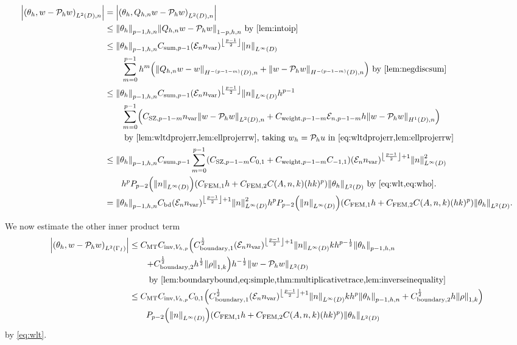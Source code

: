 \begin{align}
\abs{\IPLtDn{\thetah}{w- \Ph w}} &= \abs{\IPLtDn{\thetah}{\Qhn w - \Ph w}}\nonumber\\
&\leq \Nfn{p-1,h,n}{\thetah}\Nfn{1-p,h,n}{\Qhn w - \Ph w}\text{ by \cref{lem:intoip}}\nonumber\\
&\leq \Nfn{p-1,h,n}{\thetah} \Csumfn{p-1} \mleft(\En \nvar\mright)^{\floor{\frac{p-1}2}}\NLiD{n}\nonumber\\
&\quad\quad\sum_{m=0}^{p-1} h^{m}\mleft(\NHnfn{-(p-1-m)}{D}{\Qhn w - w}+ \NHnfn{-(p-1-m)}{D}{w - \Ph w}\mright) \text{ by \cref{lem:negdiscsum}}\nonumber\\
&\leq \Nfn{p-1,h,n}{\thetah} \Csumfn{p-1}\mleft(\En \nvar\mright)^{\floor{\frac{p-1}2}}\NLiD{n} h^{p-1}\nonumber\\
&\quad\quad\sum_{m=0}^{p-1} \mleft(\CSZfn{p-1-m}\nvar \NLtDn{w - \Ph w} + \Cwfn{p-1-m} \errn{p-1-m} h \NHoDn{w - \Ph w}\mright)\nonumber\\
&\quad\quad\text{ by \cref{lem:wltdprojerr,lem:ellprojerrw}, taking $\wh = \Ph u$ in \cref{eq:wltdprojerr,lem:ellprojerrw}}\nonumber\\
&\leq \Nfn{p-1,h,n}{\thetah} \Csumfn{p-1}\sum_{m=0}^{p-1} \mleft(\CSZfn{p-1-m}\Cfn{0,1} + \Cwfn{p-1-m} \Cfn{-1,1}\mright)                         \mleft(\En \nvar\mright)^{\floor{\frac{p-1}2}+1}\NLiD{n}^2 \nonumber\\
&\quad\quad h^p \Pfn{p-2}\mleft(\NLiD{n}\mright)\mleft(\CFEMotilde h + \CFEMttilde \CAnk (hk)^p\mright) \NLtD{\thetah} \text{ by \cref{eq:wlt,eq:who}}.\nonumber\\
&=\Nfn{p-1,h,n}{\thetah}  \Cfourteen \mleft(\En \nvar\mright)^{\floor{\frac{p-1}2}+1}\NLiD{n}^2 h^p \Pfn{p-2}\mleft(\NLiD{n}\mright)\mleft(\CFEMotilde h + \CFEMttilde \CAnk (hk)^p\mright) \NLtD{\thetah} \label{eq:innerprod1}.
\end{align}

We now estimate the other inner product term
\begin{align}
\abs{\IPLtGI{\thetah}{w - \Ph w}} &\leq \CMT\CinvVhp\mleft(\Cboundaryo^{\half} \mleft(\En\nvar\mright)^{\floor{\frac{p-1}2}+1}\NLiD{n} k h^{p-\half} \Nfn{p-1,h,n}{\thetah}\mright.\nonumber\\
&\mleft.\quad\quad+ \Cboundaryt^{\half} h^{\half} \NW{\rho}\mright) h^{-\half}\NLtD{w - \Ph w}\nonumber\\
&\quad\quad\text{ by \cref{lem:boundarybound,eq:simple,thm:multiplicativetrace,lem:inverseinequality}}\nonumber\\
&\leq \CMT \CinvVhp \Cfn{0,1}\mleft(\Cboundaryo^{\half} \mleft(\En\nvar\mright)^{\floor{\frac{p-1}2}+1}\NLiD{n} k h^{p} \Nfn{p-1,h,n}{\thetah} + \Cboundaryt^{\half} h \NW{\rho}\mright)\nonumber\\
&\quad\quad \Pfn{p-2}\mleft(\NLiD{n}\mright)\mleft(\CFEMotilde h + \CFEMttilde \CAnk (hk)^p\mright)\NLtD{\thetah}\label{eq:innerprod2}
\end{align}
 by \cref{eq:wlt}.

